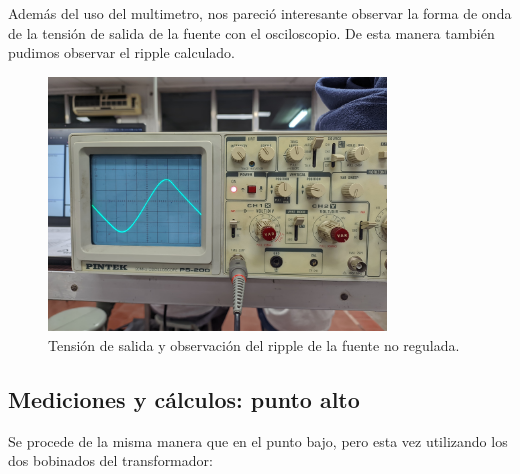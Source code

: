 \documentclass[chaptersright]{informeutn}
\begin{document}
        Además del uso del multimetro, nos pareció interesante observar la forma de onda de la tensión de salida de la
        fuente con el osciloscopio. De esta manera también pudimos observar el ripple calculado.
        \begin{figure}[!h]
          \centering
          \includegraphics[width=0.8\textwidth]{pictures/ripple_fuente-nreg.jpeg}
          \caption{Tensión de salida y observación del ripple de la fuente no regulada.}
        \end{figure}

        \subsection{Mediciones y cálculos: punto alto}
            Se procede de la misma manera que en el punto bajo, pero esta vez utilizando los dos bobinados del
            transformador:
\end{document}
